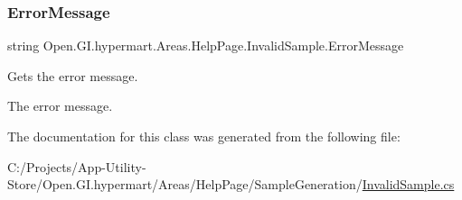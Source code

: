 \subsubsection{\texorpdfstring{Error\+Message}{ErrorMessage}}
{\footnotesize\ttfamily string Open.\+G\+I.\+hypermart.\+Areas.\+Help\+Page.\+Invalid\+Sample.\+Error\+Message\hspace{0.3cm}{\ttfamily [get]}}



Gets the error message. 

The error message. 

The documentation for this class was generated from the following file\+:\begin{DoxyCompactItemize}
\item 
C\+:/\+Projects/\+App-\/\+Utility-\/\+Store/\+Open.\+G\+I.\+hypermart/\+Areas/\+Help\+Page/\+Sample\+Generation/\hyperlink{_invalid_sample_8cs}{Invalid\+Sample.\+cs}\end{DoxyCompactItemize}
